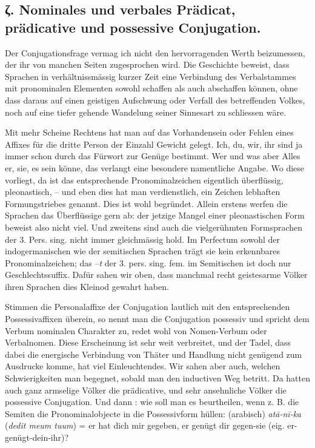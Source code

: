 \subsection*{ζ. Nominales und verbales Prädicat, prädicative und possessive Conjugation.}\label{IV.IV.Iczeta}

Der Conjugationsfrage vermag ich nicht den hervorragenden Werth beizumessen, der ihr von manchen Seiten zugesprochen wird. Die Geschichte beweist, dass Sprachen in verhältnissmässig kurzer Zeit eine Verbindung des Verbalstammes mit pronominalen Elementen sowohl schaffen als auch abschaffen können, ohne dass daraus auf einen geistigen Aufschwung oder Verfall des betreffenden Volkes, noch auf eine tiefer gehende Wandelung seiner Sinnesart zu schliessen wäre.

Mit mehr Scheine Rechtens hat man auf das Vorhandensein oder Fehlen eines Affixes für die dritte Person der Einzahl Gewicht gelegt. Ich, du, wir, ihr sind ja immer schon durch das Fürwort zur Genüge bestimmt. Wer und was aber Alles er, sie, es sein könne, das verlangt eine besondere namentliche Angabe. Wo diese vorliegt, da ist das entsprechende Pronominalzeichen eigentlich überflüssig, pleonastisch, – und eben dies hat man verdienstlich, ein Zeichen lebhaften Formungstriebes genannt. Dies ist wohl begründet. Allein erstens werfen die Sprachen das Überflüssige gern ab: der jetzige Mangel einer pleonastischen Form beweist also nicht viel. Und zweitens sind auch die vielgerühmten Formsprachen der 3. Pers. sing. nicht immer gleichmässig hold. Im Perfec\label{fp.440}tum sowohl der indogermanischen wie der semitischen Sprachen trägt sie kein erkennbares Pronominalzeichen; das –\textit{t} der 3. pers. sing. fem. im Semitischen ist doch nur Geschlechtssuffix. Dafür sahen wir oben, dass manchmal recht geistesarme Völker ihren Sprachen dies Kleinod gewahrt haben.

Stimmen die Personalaffixe der Conjugation lautlich mit den entsprechenden Possessivaffixen überein, so nennt man die Conjugation possessiv und spricht dem Verbum nominalen Charakter zu, redet wohl von Nomen-Verbum oder Verbalnomen. Diese Erscheinung ist sehr weit verbreitet, und der Tadel, dass dabei die energische Verbindung von Thäter und Handlung nicht genügend zum Ausdrucke komme, hat viel Einleuchtendes. Wir sahen aber auch, welchen Schwierigkeiten man begegnet, sobald man den inductiven Weg betritt. Da hatten auch ganz armselige Völker die prädicative, und sehr ansehnliche Völker die possessive Conjugation. Und dann : wie soll man es beurtheilen, wenn z. B. die Semiten die Pronominalobjecte in die Possessivform hüllen: (arabisch) \textit{a}{\ain}\textit{tā-nī-ka} (\textit{dedit meum tuum}) = er hat dich mir gegeben,  er genügt dir gegen-sie (eig. er-genügt-dein-ihr)?

